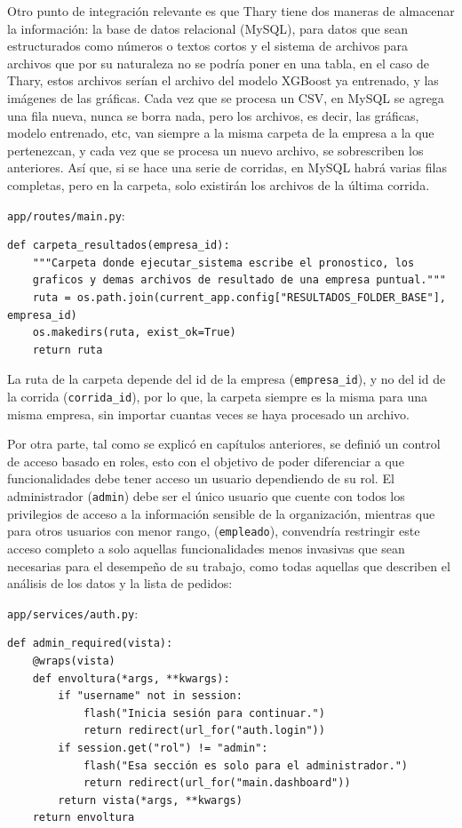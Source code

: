 Otro punto de integración relevante es que Thary tiene dos maneras de almacenar la información: la base de datos relacional (MySQL), para datos que sean estructurados como números o textos cortos y el sistema de archivos para archivos que por su naturaleza no se podría poner en una tabla, en el caso de Thary, estos archivos serían el archivo del modelo XGBoost ya entrenado, y las imágenes de las gráficas. Cada vez que se procesa un CSV, en MySQL se agrega una fila nueva, nunca se borra nada, pero los archivos, es decir, las gráficas, modelo entrenado, etc, van siempre a la misma carpeta de la empresa a la que pertenezcan, y cada vez que se procesa un nuevo archivo, se sobrescriben los anteriores. Así que, si se hace una serie de corridas, en MySQL habrá varias filas completas, pero en la carpeta, solo existirán los archivos de la última corrida. 

\texttt{app/routes/main.py}:
\label{lst:carpeta_resultados}
\begin{verbatim}
def carpeta_resultados(empresa_id):
    """Carpeta donde ejecutar_sistema escribe el pronostico, los
    graficos y demas archivos de resultado de una empresa puntual."""
    ruta = os.path.join(current_app.config["RESULTADOS_FOLDER_BASE"], empresa_id)
    os.makedirs(ruta, exist_ok=True)
    return ruta
\end{verbatim}

La ruta de la carpeta depende del id de la empresa (\texttt{empresa\_id}), y no del id de la corrida (\texttt{corrida\_id}), por lo que, la carpeta siempre es la misma para una misma empresa, sin importar cuantas veces se haya procesado un archivo. 

Por otra parte, tal como se explicó en capítulos anteriores, se definió un control de acceso basado en roles, esto con el objetivo de poder diferenciar a que funcionalidades debe tener acceso un usuario dependiendo de su rol. El administrador (\texttt{admin}) debe ser el único usuario que cuente con todos los privilegios de acceso a la información sensible de la organización, mientras que para otros usuarios con menor rango, (\texttt{empleado}), convendría restringir este acceso completo a solo aquellas funcionalidades menos invasivas que sean necesarias para el desempeño de su trabajo, como todas aquellas que describen el análisis de los datos y la lista de pedidos: 

\texttt{app/services/auth.py}:
\label{lst:admin_required}
\begin{verbatim}
def admin_required(vista):
    @wraps(vista)
    def envoltura(*args, **kwargs):
        if "username" not in session:
            flash("Inicia sesión para continuar.")
            return redirect(url_for("auth.login"))
        if session.get("rol") != "admin":
            flash("Esa sección es solo para el administrador.")
            return redirect(url_for("main.dashboard"))
        return vista(*args, **kwargs)
    return envoltura
\end{verbatim}


